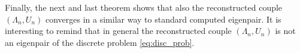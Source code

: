 \documentclass[preprint,12pt]{elsarticle}
\begin{document}


%



Finally, the next and last theorem shows that also the reconstructed couple $(\Lambda_n,U_n)$ converges in a similar way to standard computed eigenpair. It is interesting to remind that in general the reconstructed couple $(\Lambda_n,U_n)$ is not an eigenpair of the discrete problem \eqref{eq:disc_prob}.

\end{document}
